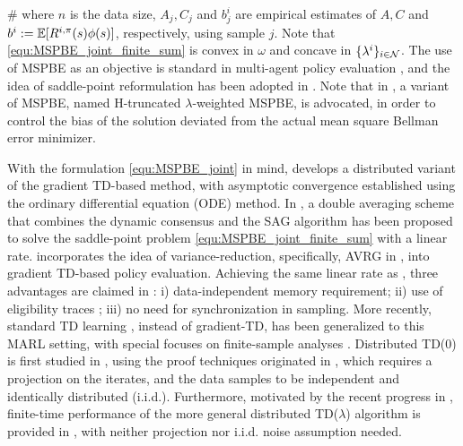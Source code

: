 \#
where $n$ is the data size, $A_j,C_j$ and $b^i_j$ are empirical estimates of $A,C$ and $b^i:=\mathbb{E}[R^{i,\pi}(s)\phi(s)]$, respectively, using sample $j$.  
Note that \eqref{equ:MSPBE_joint_finite_sum} is convex in $\omega$ and concave in $\{\lambda^i\}_{i\in\mathcal{N}}$. The use of   MSPBE as an objective is standard in multi-agent policy evaluation \cite{macua2015distributed,lee2018primal,wai2018multi,doan2019finitea,doan2019finiteb}, and the idea of  saddle-point reformulation  has been adopted in \cite{macua2015distributed,lee2018primal,wai2018multi,cassano2018multi}. Note that in \cite{cassano2018multi}, a variant of MSPBE, named H-truncated $\lambda$-weighted MSPBE, is advocated, in order to control the bias of the solution deviated from the actual mean square Bellman error minimizer.  

With the formulation \eqref{equ:MSPBE_joint} in mind, \cite{lee2018primal} develops a distributed variant of the gradient TD-based method, with asymptotic   convergence established using the ordinary differential equation (ODE) method.  In \cite{wai2018multi},  a double averaging scheme that combines the dynamic consensus  \cite{qu2017harnessing} and the SAG algorithm \cite{schmidt2017minimizing} has been proposed to solve the saddle-point problem \eqref{equ:MSPBE_joint_finite_sum} with a linear rate. \cite{cassano2018multi} incorporates the idea of   variance-reduction, specifically, AVRG in \cite{ying2018convergence}, into  gradient TD-based policy evaluation. Achieving the same linear rate as \cite{wai2018multi}, three  advantages are claimed in  \cite{cassano2018multi}: i)  data-independent memory requirement; ii) use of eligibility traces \cite{singh1996reinforcement}; iii) no need for  synchronization  in sampling. More recently, standard TD learning \cite{tesauro1995temporal}, instead of gradient-TD, has been generalized to this MARL setting, with special focuses on  finite-sample analyses \cite{doan2019finitea,doan2019finiteb}.  
Distributed TD($0$) is first studied in \cite{doan2019finitea}, using the proof techniques originated in \cite{pmlr-v75-bhandari18a}, which requires a projection on the iterates, and the data samples to be independent and identically distributed (i.i.d.). Furthermore, motivated by the recent progress in \cite{pmlr-v99-srikant19a}, finite-time performance of the  more general  distributed TD($\lambda$) algorithm is provided in \cite{doan2019finiteb}, with neither projection nor i.i.d. noise assumption needed.  



